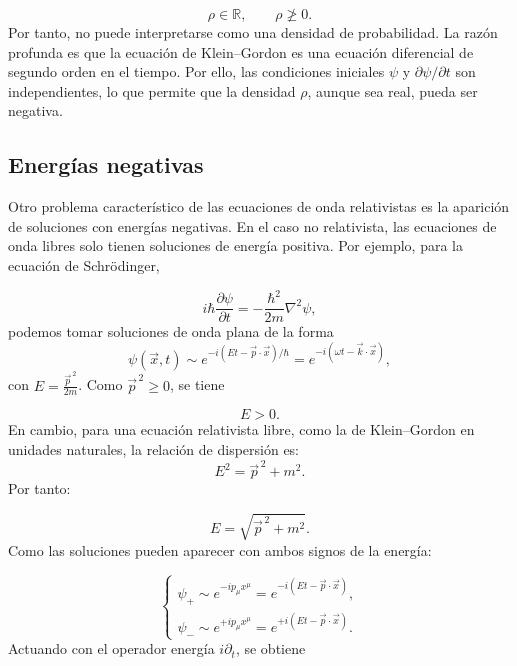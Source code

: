 \documentclass[a4paper,11pt]{book} %
\begin{document}
\begin{equation}
    \rho \in \mathbb{R},
    \qquad
    \rho \not\geq 0.
\end{equation}
\noindent
Por tanto, no puede interpretarse como una densidad de probabilidad. La razón profunda es que la ecuación de Klein--Gordon es una ecuación
diferencial de segundo orden en el tiempo. Por ello, las condiciones iniciales
\(\psi\) y \(\partial\psi/\partial t\) son independientes, lo que permite que
la densidad \(\rho\), aunque sea real, pueda ser negativa.

\subsection{Energías negativas}
\noindent
Otro problema característico de las ecuaciones de onda relativistas es la
aparición de soluciones con energías negativas. En el caso no relativista, las ecuaciones de onda libres solo tienen soluciones
de energía positiva. Por ejemplo, para la ecuación de Schrödinger,

\begin{equation}
    i\hbar \frac{\partial \psi}{\partial t}
    =
    -\frac{\hbar^2}{2m}\nabla^2\psi,
\end{equation}
\noindent
podemos tomar soluciones de onda plana de la forma
\begin{equation}
    \psi(\vec{x},t)
    \sim
    e^{-i(Et-\vec{p}\cdot\vec{x})/\hbar}
    =
    e^{-i(\omega t-\vec{k}\cdot\vec{x})},
\end{equation}
\noindent
con $
    E = \frac{\vec{p}^{\,2}}{2m}$. Como \(\vec{p}^{\,2}\geq 0\), se tiene

\begin{equation}
    E > 0.
\end{equation}
\noindent
En cambio, para una ecuación relativista libre, como la de Klein--Gordon en
unidades naturales, la relación de dispersión es:
\begin{equation}
    E^2 = \vec{p}^{\,2} + m^2.
\end{equation}
Por tanto:

\begin{equation}
    E = \sqrt{\vec{p}^{\,2}+m^2}.
\end{equation}
\newpage\noindent
Como las soluciones pueden aparecer con ambos signos de la energía:

\begin{equation}
\begin{cases}
    \psi_+
    \sim
    e^{-ip_\mu x^\mu}
    =
    e^{-i(Et-\vec{p}\cdot\vec{x})},
    \\[0.2cm]
    \psi_-
    \sim
    e^{+ip_\mu x^\mu}
    =
    e^{+i(Et-\vec{p}\cdot\vec{x})}.
\end{cases}
\end{equation}
\noindent
Actuando con el operador energía \(i\partial_t\), se obtiene
\end{document}
